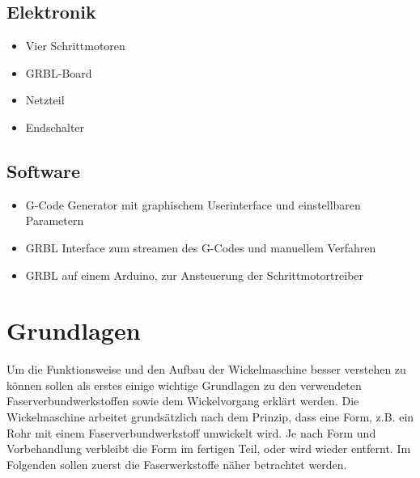 \documentclass[paper=A4,pagesize,DIV=18, 12pt,listof=totoc,bibliography=totoc,headings=optiontohead,open=any]{article}
\begin{document}
\subsection{Elektronik}
\begin{itemize}
    \item Vier Schrittmotoren
    \item GRBL-Board 
    \item Netzteil
    \item Endschalter
\end{itemize}


\subsection{Software}
\begin{itemize}
    \item G-Code Generator mit graphischem Userinterface und einstellbaren Parametern
    \item GRBL Interface zum streamen des G-Codes und manuellem Verfahren
    \item GRBL auf einem Arduino, zur Ansteuerung der Schrittmotortreiber
\end{itemize}

\section{Grundlagen}
Um die Funktionsweise und den Aufbau der Wickelmaschine besser verstehen zu können sollen als erstes einige wichtige Grundlagen zu den verwendeten Faserverbundwerkstoffen sowie dem Wickelvorgang erklärt werden. Die Wickelmaschine arbeitet grundsätzlich nach dem Prinzip, dass eine Form, z.B. ein Rohr mit einem Faserverbundwerkstoff umwickelt wird. Je nach Form und Vorbehandlung verbleibt die Form im fertigen Teil, oder wird wieder entfernt. Im Folgenden sollen zuerst die Faserwerkstoffe näher betrachtet werden.
\end{document}
